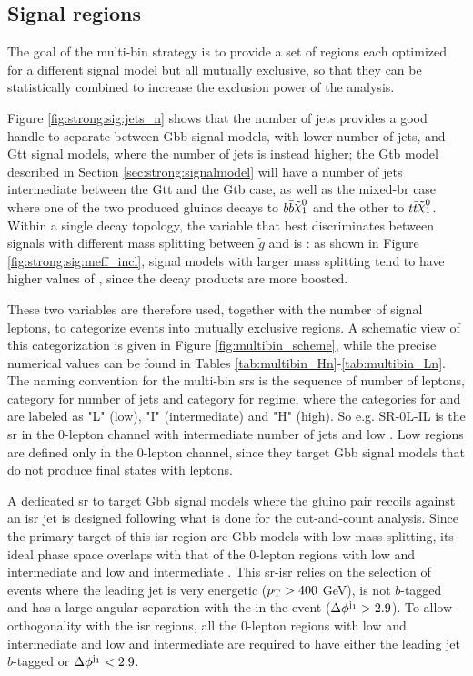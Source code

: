 \subsection{Signal regions}

The goal of the multi-bin strategy is to provide a set of regions each optimized for a different signal model 
but all mutually exclusive, so that they can be statistically combined to increase the exclusion power of the analysis.

Figure \ref{fig:strong:sig:jets_n} shows that the number of jets provides a good handle to separate 
between Gbb signal models, with lower number of jets, and Gtt signal models, where the number of jets is instead higher;
the Gtb model described in Section \ref{sec:strong:signalmodel} will have a number of jets intermediate between the Gtt and the Gtb case, 
as well as the mixed-\gls{br} case where one of the two produced gluinos decays to $b \bar{b} \ninoone$ and the other to 
$t \bar{t} \ninoone$.
Within a single decay topology, the variable that best discriminates between signals with different mass splitting between $\tilde{g}$ and
\ninoone is \meff: as shown in Figure \ref{fig:strong:sig:meff_incl}, signal models with larger mass splitting tend to have higher values 
of \meff, since the decay products are more boosted. 

These two variables are therefore used, together with the number of signal leptons, to categorize events into mutually exclusive regions. 
A schematic view of this categorization is given in Figure \ref{fig:multibin_scheme}, while the precise numerical values can be found 
in Tables \ref{tab:multibin_Hn}-\ref{tab:multibin_Ln}.
The naming convention for the multi-bin \glspl{sr} is the sequence of number of leptons, category for number of jets and category for \meff regime,
where the categories for \njet and \meff are labeled as "L" (low), "I" (intermediate) and "H" (high). So e.g. SR-0L-IL is the \gls{sr} in the 0-lepton channel with intermediate number of jets and low \meff. Low \njet regions are defined only in the 0-lepton channel, since they 
target Gbb signal models that do not produce final states with leptons. 

A dedicated \gls{sr} to target Gbb signal models where the gluino pair recoils against an \gls{isr} jet is designed following 
what is done for the cut-and-count analysis. 
Since the primary target of this \gls{isr} region are Gbb models with low mass splitting, its ideal phase space 
overlaps with that of the 0-lepton regions with low and intermediate \njet and low and intermediate \meff. 
This \gls{sr}-\gls{isr} relies on the selection of events where the leading jet is very energetic ($p_{\rm T} > 400$ GeV),
 is not $b$-tagged and has a large angular separation with the \met in the event (${\Delta}\phi^{\mathrm{j}_1} > 2.9$). 
To allow orthogonality with the \gls{isr} regions, all the 0-lepton regions with low and intermediate \njet and low and intermediate \meff
are required to have either the leading jet $b$-tagged or ${\Delta}\phi^{\mathrm{j}_1} < 2.9$. 

